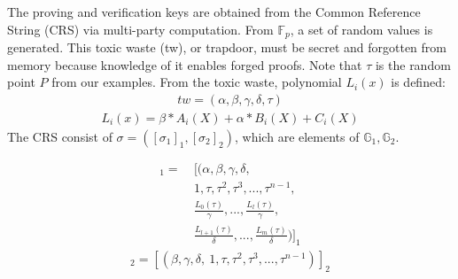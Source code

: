 The proving and verification keys are obtained from the Common Reference String (CRS) via multi-party computation. From \begin{math}\mathbb{F}_p\end{math}, a set of random values is generated. This toxic waste (tw), or trapdoor, must be secret and forgotten from memory because knowledge of it enables forged proofs. Note that \begin{math}\tau\end{math} is the random point \(P\) from our examples. From the toxic waste, polynomial \(L_i(x)\) is defined:
\begin{align}
    tw = (\alpha, \beta, \gamma, \delta, \tau) 
\end{align}
\begin{align*}
    L_i(x) = \beta * A_i(X) + \alpha * B_i(X) + C_i(X)
\end{align*}
The CRS consist of \begin{math} \sigma = ([\sigma_1]_1,[\sigma_2]_2)\end{math}, which are elements of \begin{math} \mathbb{G}_1, \mathbb{G}_2\end{math}.

\begin{align}
    [\sigma_1]_1 = 
    &\ [(\alpha, \beta, \gamma, \delta, \\
    &\ 1, \tau, \tau^2, \tau^3, ..., \tau^{n-1}, \\
    &\ \frac{L_0(\tau)}{\gamma}, ..., \frac{L_l(\tau)}{\gamma}, \\
    &\ \frac{L_{l+1}(\tau)}{\delta}, ..., \frac{L_m(\tau)}{\delta})]_1 
\end{align}
\begin{align*}
    [\sigma_2]_2 = [(\beta, \gamma, \delta, \ 1, \tau, \tau^2, \tau^3, ..., \tau^{n-1})]_2
\end{align*}

